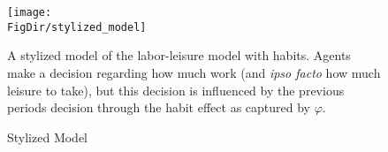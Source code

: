 \begin{figure}[ht]
  \centerline{
    \texttt{[image: \\FigDir/stylized\_model]}
  }
  \caption{Stylized Model} \label{fig:stylized_model}
  \footnotesize{A stylized model of the labor-leisure model with habits. Agents make a decision regarding how much work (and \emph{ipso facto} how much leisure to take), but this decision is influenced by the previous periods decision through the habit effect as captured by $\varphi$.}
\end{figure}



